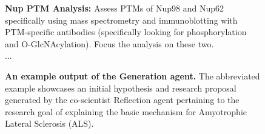 \begin{figure}[htbp!]
\begin{tcolorbox}[
    colback=black!5!white,
    colframe=black!60!white,
    title=\textbf{Example output of the Generation agent},
    fonttitle=\bfseries,
    arc=3mm,
    boxrule=1pt,
    bottomrule=2pt,
]
\textbf{Nup PTM Analysis:} Assess PTMs of Nup98 and Nup62 specifically using mass spectrometry and immunoblotting with PTM-specific antibodies (specifically looking for phosphorylation and O-GlcNAcylation). Focus the analysis on these two.
\\
...
\end{tcolorbox}
\vspace{0.1cm}
\caption{\textbf{An example output of the Generation agent.} The abbreviated example showcases an initial hypothesis and research proposal generated by the co-scientist Reflection agent pertaining to the research goal of explaining the basic mechanism for Amyotrophic Lateral Sclerosis (ALS).}
\label{fig:ex_generation}
\end{figure}





